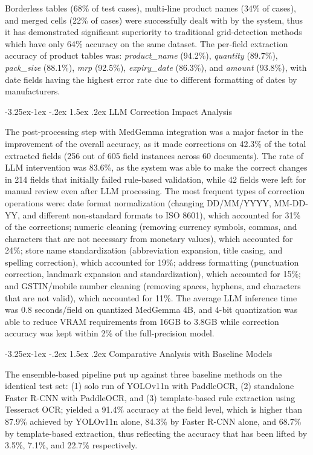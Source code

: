 \documentclass[conference,twocolumn]{IEEEtran}
\makeatletter
\renewcommand{\subsection}{\@startsection{subsection}{2}{\z@}%
  {-3.25ex\@plus -1ex \@minus -.2ex}%
  {1.5ex \@plus .2ex}%
  {\normalfont\normalsize\bfseries\itshape}}
\makeatother
\begin{document}
Borderless tables (68\% of test cases), multi-line product names (34\%
of cases), and merged cells (22\% of cases) were successfully dealt with
by the system, thus it has demonstrated significant superiority to
traditional grid-detection methods which have only 64\% accuracy on the
same dataset. The per-field extraction accuracy of product tables was:
\textit{product\_name} (94.2\%), \textit{quantity} (89.7\%),
\textit{pack\_size} (88.1\%), \textit{mrp} (92.5\%), \textit{expiry\_date}
(86.3\%), and \textit{amount} (93.8\%), with date fields having the
highest error rate due to different formatting of dates by
manufacturers.

\subsection{LLM Correction Impact Analysis}

The post-processing step with MedGemma integration was a major factor in the
improvement of the overall accuracy, as it made corrections on 42.3\% of
the total extracted fields (256 out of 605 field instances across 60
documents). The rate of LLM intervention was 83.6\%, as the system was
able to make the correct changes in 214 fields that initially failed
rule-based validation, while 42 fields were left for manual review even
after LLM processing. The most frequent types of correction operations
were: date format normalization (changing DD/MM/YYYY, MM-DD-YY, and
different non-standard formats to ISO 8601), which accounted for 31\% of
the corrections; numeric cleaning (removing currency symbols, commas,
and characters that are not necessary from monetary values), which
accounted for 24\%; store name standardization (abbreviation expansion,
title casing, and spelling correction), which accounted for 19\%;
address formatting (punctuation correction, landmark expansion and
standardization), which accounted for 15\%; and GSTIN/mobile number
cleaning (removing spaces, hyphens, and characters that are not valid),
which accounted for 11\%. The average LLM inference time was 0.8
seconds/field on quantized MedGemma 4B, and 4-bit quantization was able
to reduce VRAM requirements from 16GB to 3.8GB while correction accuracy
was kept within 2\% of the full-precision
model.

\subsection{Comparative Analysis with Baseline Models}

The ensemble-based pipeline put up against three baseline methods on the
identical test set: (1) solo run of YOLOv11n with PaddleOCR, (2)
standalone Faster R-CNN with PaddleOCR, and (3) template-based rule
extraction using Tesseract OCR; yielded a 91.4\% accuracy at the field
level, which is higher than 87.9\% achieved by YOLOv11n alone, 84.3\% by
Faster R-CNN alone, and 68.7\% by template-based extraction, thus
reflecting the accuracy that has been lifted by 3.5\%, 7.1\%, and 22.7\%
respectively.
\end{document}
